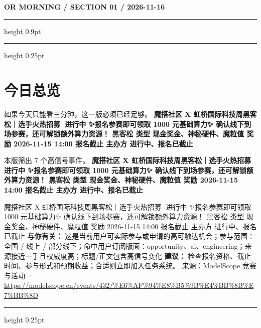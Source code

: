 \documentclass[10.5pt]{ctexart}
\begin{document}
{\small\bfseries OR MORNING / SECTION 01 / 2026-11-16}
\vspace{2mm}
\hrule height 0.9pt
\vspace{1.5mm}
\hrule height 0.25pt
\vspace{4mm}
\section*{今日总览}
{\color{ormuted} 如果今天只能看三分钟，这一版必须已经足够。}
\vspace{2mm}
{\fontsize{25}{29}\selectfont\bfseries 魔搭社区 X 虹桥国际科技周黑客松｜选手火热招募🚀 进行中 ✨报名参赛即可领取 1000 元基础算力✨ 确认线下到场参赛，还可解锁额外算力资源！ 黑客松 类型 现金奖金、神秘硬件、魔粒值 奖励 2026-11-15 14:00 报名截止 主办方 进行中、报名已截止}\par
\vspace{2mm}
{\large 本版筛出 7 个高信号事件。}
\vspace{3mm}
{\Large\bfseries 魔搭社区 X 虹桥国际科技周黑客松｜选手火热招募🚀 进行中 ✨报名参赛即可领取 1000 元基础算力✨ 确认线下到场参赛，还可解锁额外算力资源！ 黑客松 类型 现金奖金、神秘硬件、魔粒值 奖励 2026-11-15 14:00 报名截止 主办方 进行中、报名已截止}\par
魔搭社区 X 虹桥国际科技周黑客松｜选手火热招募🚀 进行中 ✨报名参赛即可领取 1000 元基础算力✨ 确认线下到场参赛，还可解锁额外算力资源！ 黑客松 类型 现金奖金、神秘硬件、魔粒值 奖励 2026-11-15 14:00 报名截止 主办方 进行中、报名已截止
\textbf{与你有关：} 这是当前用户可实际参与或申请的高可触达机会；参与范围：全国 / 线上 / 部分线下；命中用户订阅版面：opportunity、ai、engineering；来源接近一手且权威度高；标题/正文包含高信号变化
\textbf{建议：} 检查报名资格、截止时间、参与形式和预期收益；合适则立即加入任务系统。
{\footnotesize\color{ormuted} 来源：ModelScope 竞赛与活动 · \url{https://modelscope.cn/events/432/%E6%AF%94%E8%B5%9B%E4%BB%8B%E7%BB%8D}}
\vspace{3mm}
\hrule height 0.25pt
\vspace{3mm}
\end{document}
